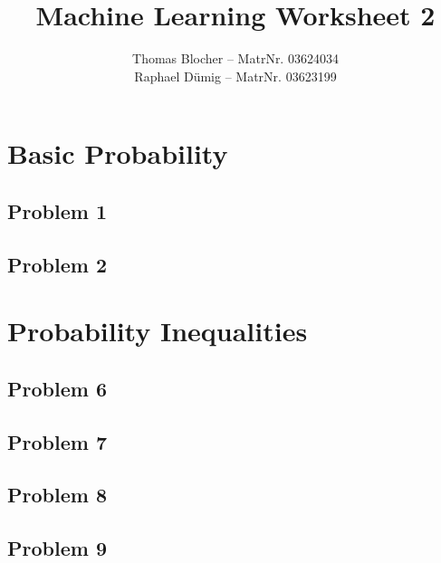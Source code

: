 \documentclass{scrartcl}
\title{Machine Learning Worksheet 2}
\author{Thomas Blocher -- MatrNr. 03624034 \\ Raphael D\"umig -- MatrNr. 03623199}
\begin{document}
\maketitle

\section{Basic Probability}
\subsection*{Problem 1}


\subsection*{Problem 2}


\section{Probability Inequalities}
\subsection*{Problem 6}


\subsection*{Problem 7}


\subsection*{Problem 8}


\subsection*{Problem 9}

\end{document}
